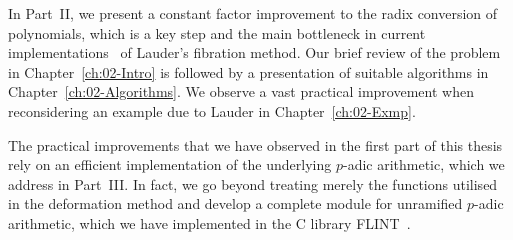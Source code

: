 In Part~{II}, we present a constant factor improvement to the 
radix conversion of polynomials, which is a key step and the 
main bottleneck in current implementations~\citep{Lauder2006,Walker2009} 
of Lauder's fibration method.  Our brief review of the problem 
in Chapter~\ref{ch:02-Intro} is followed by a presentation of suitable 
algorithms in Chapter~\ref{ch:02-Algorithms}.  We observe a vast 
practical improvement when reconsidering an example due to Lauder 
in Chapter~\ref{ch:02-Exmp}.

The practical improvements that we have observed in the first part of 
this thesis rely on an efficient implementation of the underlying 
$p$-adic arithmetic, which we address in Part~{III}.  In fact, we 
go beyond treating merely the functions utilised in the deformation 
method and develop a complete module for unramified $p$-adic arithmetic, 
which we have implemented in the C library {\sc FLINT}~\citep{FLINT}.

